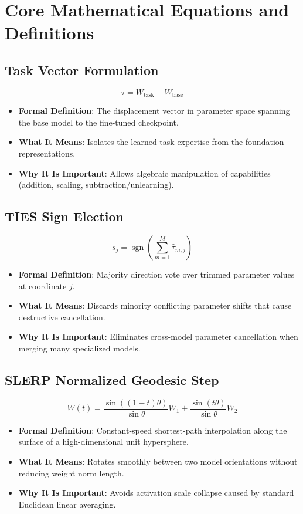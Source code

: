 \documentclass[11pt,a4paper]{article}
\theoremstyle{definition}
\begin{document}
\section{Core Mathematical Equations and Definitions}

\subsection{Task Vector Formulation}
{\boldmath
\begin{equation}
\tau = W_{\text{task}} - W_{\text{base}}
\end{equation}
}
\begin{itemize}
    \item \textbf{Formal Definition}: The displacement vector in parameter space spanning the base model to the fine-tuned checkpoint.
    \item \textbf{What It Means}: Isolates the learned task expertise from the foundation representations.
    \item \textbf{Why It Is Important}: Allows algebraic manipulation of capabilities (addition, scaling, subtraction/unlearning).
\end{itemize}

\subsection{TIES Sign Election}
{\boldmath
\begin{equation}
s_j = \operatorname{sgn}\left(\sum_{m=1}^M \hat{\tau}_{m, j}\right)
\end{equation}
}
\begin{itemize}
    \item \textbf{Formal Definition}: Majority direction vote over trimmed parameter values at coordinate $j$.
    \item \textbf{What It Means}: Discards minority conflicting parameter shifts that cause destructive cancellation.
    \item \textbf{Why It Is Important}: Eliminates cross-model parameter cancellation when merging many specialized models.
\end{itemize}

\subsection{SLERP Normalized Geodesic Step}
{\boldmath
\begin{equation}
W(t) = \frac{\sin((1 - t)\theta)}{\sin \theta} W_1 + \frac{\sin(t\theta)}{\sin \theta} W_2
\end{equation}
}
\begin{itemize}
    \item \textbf{Formal Definition}: Constant-speed shortest-path interpolation along the surface of a high-dimensional unit hypersphere.
    \item \textbf{What It Means}: Rotates smoothly between two model orientations without reducing weight norm length.
    \item \textbf{Why It Is Important}: Avoids activation scale collapse caused by standard Euclidean linear averaging.
\end{itemize}
\end{document}
